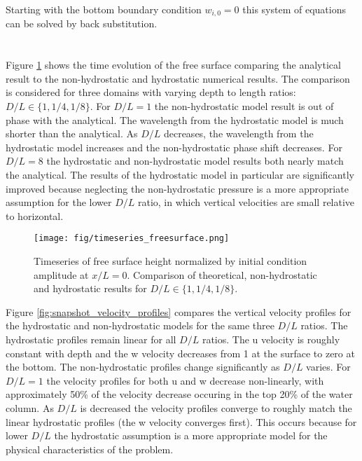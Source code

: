 \documentclass[12pt]{article}
\begin{document}
Starting with the bottom boundary condition $w_{i,0} = 0$ this system of equations can be solved by back substitution.

\section{}

Figure \ref{fig:timeseries_freesurface} shows the time evolution of the free surface comparing the analytical result to the non-hydrostatic and hydrostatic numerical results. The comparison is considered for three domains with varying depth to length ratios: $D/L \in \{1, 1/4, 1/8\}$. For $D/L = 1$ the non-hydrostatic model result is out of phase with the analytical. The wavelength from the hydrostatic model is much shorter than the analytical. As $D/L$ decreases, the wavelength from the hydrostatic model increases and the non-hydrostatic phase shift decreases. For $D/L = 8$ the hydrostatic and non-hydrostatic model results both nearly match the analytical. The results of the hydrostatic model in particular are significantly improved because neglecting the non-hydrostatic pressure is a more appropriate assumption for the lower $D/L$ ratio, in which vertical velocities are small relative to horizontal.

	\begin{figure}[htb]
		\begin{center}
			\texttt{[image: fig/timeseries\_freesurface.png]}
			\caption{Timeseries of free surface height normalized by initial condition amplitude at $x/L=0$. Comparison of theoretical, non-hydrostatic and hydrostatic results for $D/L \in \{1, 1/4, 1/8\}$.}
			\label{fig:timeseries_freesurface}
		\end{center}
	\end{figure}
	
Figure \ref{fig:snapshot_velocity_profiles} compares the vertical velocity profiles for the hydrostatic and non-hydrostatic models for the same three $D/L$ ratios. The hydrostatic profiles remain linear for all $D/L$ ratios. The u velocity is roughly constant with depth and the w velocity decreases from 1 at the surface to zero at the bottom. The non-hydrostatic profiles change significantly as $D/L$ varies. For $D/L = 1$ the velocity profiles for both u and w decrease non-linearly, with approximately 50\% of the velocity decrease occuring in the top 20\% of the water column. As $D/L$ is decreased the velocity profiles converge to roughly match the linear hydrostatic profiles (the w velocity converges first). This occurs because for lower $D/L$ the hydrostatic assumption is a more appropriate model for the physical characteristics of the problem.
\end{document}
